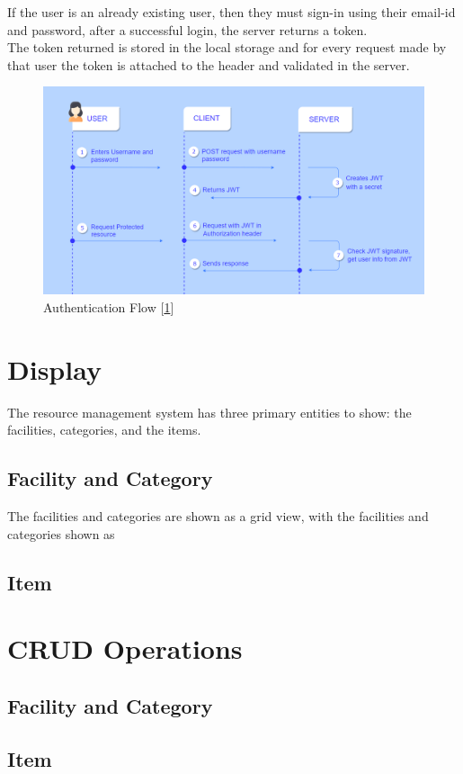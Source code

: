 If the user is an already existing user, then they must sign-in using their email-id and password, after a successful login, the server returns a token.\\
The token returned is stored in the local storage and for every request made by that user the token is attached to the header and validated in the server.\\
\begin{figure}[H]
    \centering
    \includegraphics[scale=0.5]{images/auth-flow.png}
    \caption{Authentication Flow [\hyperref[lbl]{1}]}
    \label{fig:auth-flow}
\end{figure}

\section{Display}
The resource management system has three primary entities to show: the facilities, categories, and the items.

\subsection{Facility and Category}
The facilities and categories are shown as a grid view, with the facilities and categories shown as 
\subsection{Item}

\section{CRUD Operations}
\subsection{Facility and Category}
\subsection{Item}


